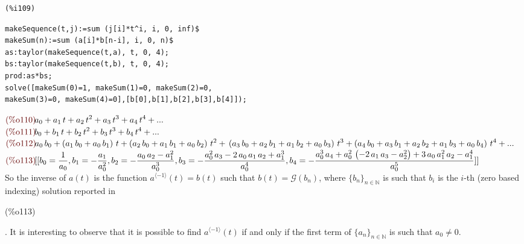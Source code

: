 \noindent
\begin{minipage}[t]{8ex}{\color{red}\bf
\begin{verbatim}
(%i109)
\end{verbatim}}
\end{minipage}
\begin{minipage}[t]{\textwidth}{\color{blue}
\begin{verbatim}
makeSequence(t,j):=sum (j[i]*t^i, i, 0, inf)$
makeSum(n):=sum (a[i]*b[n-i], i, 0, n)$
as:taylor(makeSequence(t,a), t, 0, 4);
bs:taylor(makeSequence(t,b), t, 0, 4);
prod:as*bs;
solve([makeSum(0)=1, makeSum(1)=0, makeSum(2)=0,
makeSum(3)=0, makeSum(4)=0],[b[0],b[1],b[2],b[3],b[4]]);
\end{verbatim}}
\end{minipage}
\begin{math}\displaystyle
\parbox{8ex}{\color{labelcolor}(\%o110) }
{a}_{0}+{a}_{1}\,t+{a}_{2}\,{t}^{2}+{a}_{3}\,{t}^{3}+{a}_{4}\,{t}^{4}+...
\end{math}\\
\begin{math}\displaystyle
\parbox{8ex}{\color{labelcolor}(\%o111) }
{b}_{0}+{b}_{1}\,t+{b}_{2}\,{t}^{2}+{b}_{3}\,{t}^{3}+{b}_{4}\,{t}^{4}+...
\end{math}\\
\begin{math}\displaystyle
\parbox{8ex}{\color{labelcolor}(\%o112) }
{a}_{0}\,{b}_{0}+\left( {a}_{1}\,{b}_{0}+{a}_{0}\,{b}_{1}\right)
\,t+\left( {a}_{2}\,{b}_{0}+{a}_{1}\,{b}_{1}+{a}_{0}\,{b}_{2}\right)
\,{t}^{2}+\\
\left( {a}_{3}\,{b}_{0}+{a}_{2}\,{b}_{1}+{a}_{1}\,{b}_{2}+{a}_{0}\,{b}_{3}\right) \,{t}^{3}+\left( {a}_{4}\,{b}_{0}+{a}_{3}\,{b}_{1}+{a}_{2}\,{b}_{2}+{a}_{1}\,{b}_{3}+{a}_{0}\,{b}_{4}\right) \,{t}^{4}+...
\end{math}\\
\begin{math}\displaystyle
  \parbox{8ex}{\color{labelcolor}(\%o113) }
  [[{b}_{0}=\frac{1}{{a}_{0}},{b}_{1}=-\frac{{a}_{1}}{{a}_{0}^{2}},{b}_{2}=-\frac{{a}_{0}\,{a}_{2}-{a}_{1}^{2}}{{a}_{0}^{3}},{b}_{3}=-\frac{{a}_{0}^{2}\,{a}_{3}-2\,{a}_{0}\,{a}_{1}\,{a}_{2}+{a}_{1}^{3}}{{a}_{0}^{4}},\\
  {b}_{4}=-\frac{{a}_{0}^{3}\,{a}_{4}+{a}_{0}^{2}\,\left(
      -2\,{a}_{1}\,{a}_{3}-{a}_{2}^{2}\right)
    +3\,{a}_{0}\,{a}_{1}^{2}\,{a}_{2}-{a}_{1}^{4}}{{a}_{0}^{5}}]]
\end{math}\\
So the inverse of $a(t)$ is the function $a^{\langle -1\rangle}(t)=
b(t)$ such that $b(t)= \mathcal{G} (b_n )$, where
$\{b_n\}_{n\in\mathbb{N} } $ is such that $b_i$ is the $i$-th (zero
based indexing) solution reported
in \parbox{8ex}{\color{labelcolor}(\%o113) }. It is interesting to
observe that it is possible to find $a^{\langle -1\rangle}(t)$ if and
only if the first term of $\{a_n\}_{n\in\mathbb{N} } $ is such that
$a_0 \not = 0$.

